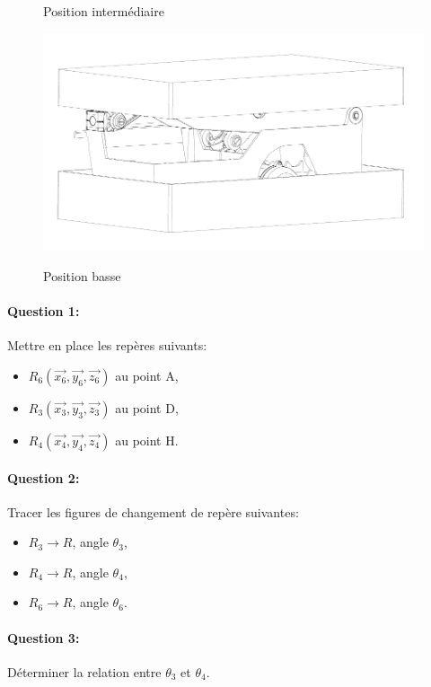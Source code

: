 \begin{figure}[htbp]
\begin{minipage}[c]{.4\linewidth}
\begin{center}
\caption{Position intermédiaire}
\label{fig:imagechaise5}
\includegraphics[width=\linewidth]{img/pos_basse.png}
\caption{Position basse}
\label{fig:imagechaise6}
\end{center}
\end{minipage}
\end{figure}

\paragraph{Question 1:} Mettre en place les repères suivants:
\begin{itemize}
 \item $R_6(\overrightarrow{x_6},\overrightarrow{y_6},\overrightarrow{z_6})$ au point A,
 \item $R_3(\overrightarrow{x_3},\overrightarrow{y_3},\overrightarrow{z_3})$ au point D,
 \item $R_4(\overrightarrow{x_4},\overrightarrow{y_4},\overrightarrow{z_4})$ au point H. 
\end{itemize}

\paragraph{Question 2:} Tracer les figures de changement de repère suivantes:
\begin{itemize}
 \item $R_3 \rightarrow R$, angle $\theta_{3}$,
 \item $R_4 \rightarrow R$, angle $\theta_{4}$,
 \item $R_6 \rightarrow R$, angle $\theta_{6}$.
\end{itemize}

\paragraph{Question 3:} Déterminer la relation entre $\theta_{3}$ et $\theta_{4}$.


